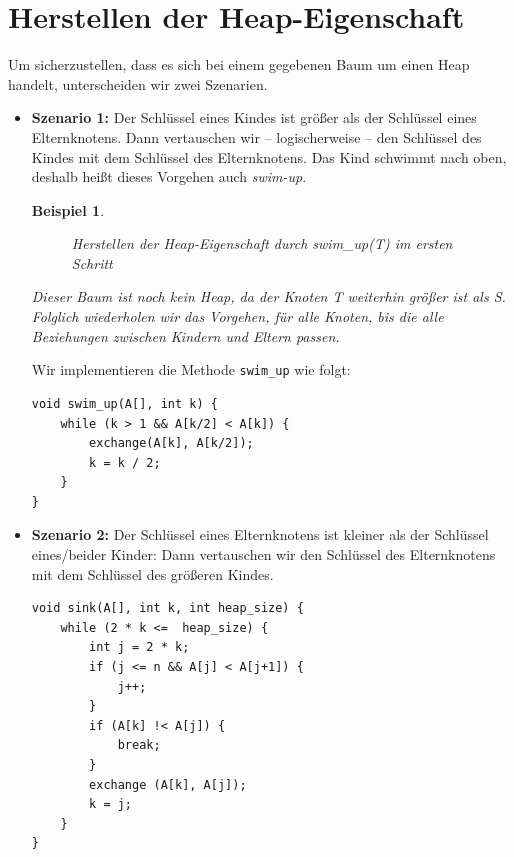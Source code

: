 \documentclass[11pt,a4paper]{scrartcl}
\newtheorem{example}{Beispiel}
\begin{document}
\section{Herstellen der Heap-Eigenschaft}
Um sicherzustellen, dass es sich bei einem gegebenen Baum um einen Heap handelt, unterscheiden wir zwei Szenarien.
\begin{itemize}
\item \textbf{Szenario 1:} Der Schlüssel eines Kindes ist größer als der Schlüssel eines Elternknotens. Dann vertauschen wir -- logischerweise -- den Schlüssel des Kindes mit dem Schlüssel des Elternknotens. Das Kind {\glqq}schwimmt nach oben{\grqq}, deshalb heißt dieses Vorgehen auch \textit{swim-up}.
\begin{example}
\begin{figure}[h!]
\hspace{-2cm}
\caption{Herstellen der Heap-Eigenschaft durch swim{\_}up(T) im ersten Schritt}
\end{figure}
Dieser Baum ist noch kein Heap, da der Knoten T weiterhin größer ist als S. Folglich wiederholen wir das Vorgehen, für alle Knoten, bis die alle Beziehungen zwischen Kindern und Eltern passen.
\end{example}
Wir implementieren die Methode \texttt{swim{\_}up} wie folgt:\\
\begin{lstlisting}
void swim_up(A[], int k) {
	while (k > 1 && A[k/2] < A[k]) {
		exchange(A[k], A[k/2]);
		k = k / 2;	
	}
}
\end{lstlisting}
\item \textbf{Szenario 2:} Der Schlüssel eines Elternknotens ist kleiner als der Schlüssel eines/beider Kinder: Dann vertauschen wir den Schlüssel des Elternknotens mit dem Schlüssel des größeren Kindes.
\begin{lstlisting}
void sink(A[], int k, int heap_size) {
	while (2 * k <=  heap_size) {
		int j = 2 * k;
		if (j <= n && A[j] < A[j+1]) {
			j++;		
		}
		if (A[k] !< A[j]) {
			break;		
		}
		exchange (A[k], A[j]);
		k = j;	
	}
}
\end{lstlisting}
\end{itemize}
\end{document}
